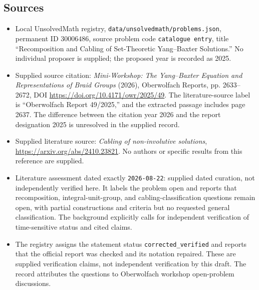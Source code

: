 \documentclass[11pt]{article}
\begin{document}
\subsection{Sources}
\begin{itemize}
\item Local UnsolvedMath registry, \texttt{data/unsolvedmath/problems.json}, permanent ID \(30006486\), source problem code \texttt{catalogue entry}, title ``Recomposition and Cabling of Set-Theoretic Yang--Baxter Solutions.'' No individual proposer is supplied; the proposed year is recorded as 2025.
\item Supplied source citation: \emph{Mini-Workshop: The Yang--Baxter Equation and Representations of Braid Groups} (2026), Oberwolfach Reports, pp. 2633--2672, DOI \url{https://doi.org/10.4171/owr/2025/49}. The literature-source label is ``Oberwolfach Report 49/2025,'' and the extracted passage includes page 2637. The difference between the citation year 2026 and the report designation 2025 is unresolved in the supplied record.
\item Supplied literature source: \emph{Cabling of non-involutive solutions}, \url{https://arxiv.org/abs/2410.23821}. No authors or specific results from this reference are supplied.
\item Literature assessment dated exactly \texttt{2026-08-22}: supplied dated curation, not independently verified here. It labels the problem open and reports that recomposition, integral-unit-group, and cabling-classification questions remain open, with partial constructions and criteria but no requested general classification. The background explicitly calls for independent verification of time-sensitive status and cited claims.
\item The registry assigns the statement status \texttt{corrected\_verified} and reports that the official report was checked and its notation repaired. These are supplied verification claims, not independent verification by this draft. The record attributes the questions to Oberwolfach workshop open-problem discussions.
\end{itemize}
\end{document}
